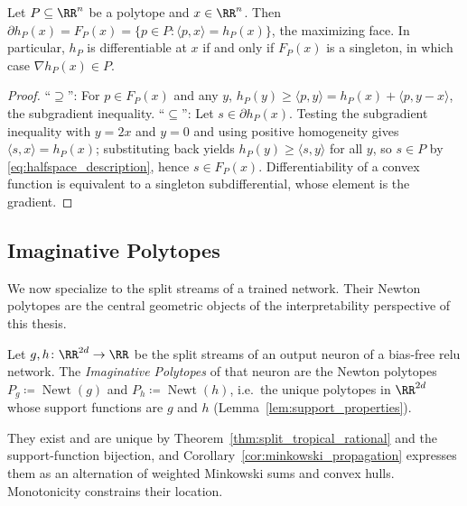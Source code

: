 \begin{proposition}\label{prop:subdifferential_face}
Let $P \subseteq \RR^n$ be a polytope and $x \in \RR^n$. Then $\partial h_P(x) = F_P(x) = \{ p \in P : \langle p, x \rangle = h_P(x) \}$, the maximizing face. In particular, $h_P$ is differentiable at $x$ if and only if $F_P(x)$ is a singleton, in which case $\nabla h_P(x) \in P$.
\hfill{}
\end{proposition}

\begin{proof}
``$\supseteq$'': For $p \in F_P(x)$ and any $y$, $h_P(y) \ge \langle p, y \rangle = h_P(x) + \langle p, y - x \rangle$, the subgradient inequality. ``$\subseteq$'': Let $s \in \partial h_P(x)$. Testing the subgradient inequality with $y = 2x$ and $y = 0$ and using positive homogeneity gives $\langle s, x \rangle = h_P(x)$; substituting back yields $h_P(y) \ge \langle s, y \rangle$ for all $y$, so $s \in P$ by \eqref{eq:halfspace_description}, hence $s \in F_P(x)$. Differentiability of a convex function is equivalent to a singleton subdifferential, whose element is the gradient.
\end{proof}

\subsection{Imaginative Polytopes}\label{sec:imaginative_polytopes}

We now specialize to the split streams of a trained network. Their Newton polytopes are the central geometric objects of the interpretability perspective of this thesis.

\begin{definition}\label{def:imaginative_polytopes}
Let $g, h \colon \RR^{2d} \to \RR$ be the split streams of an output neuron of a bias-free \ac{relu} network. The \emph{Imaginative Polytopes} of that neuron are the Newton polytopes $P_g \coloneqq \operatorname{Newt}(g)$ and $P_h \coloneqq \operatorname{Newt}(h)$, i.e.\ the unique polytopes in $\RR^{2d}$ whose support functions are $g$ and $h$ (Lemma~\ref{lem:support_properties}).
\end{definition}

They exist and are unique by Theorem~\ref{thm:split_tropical_rational} and the support-function bijection, and Corollary~\ref{cor:minkowski_propagation} expresses them as an alternation of weighted Minkowski sums and convex hulls. Monotonicity constrains their location.

